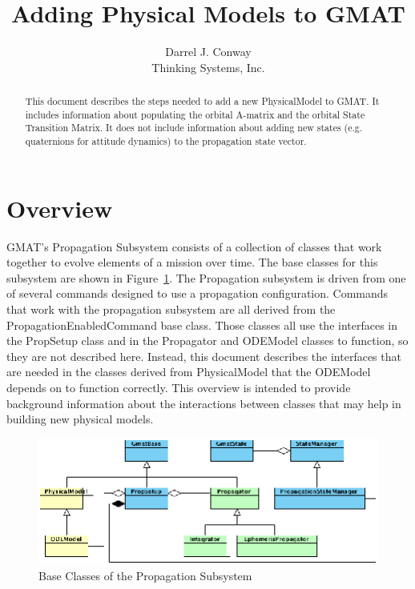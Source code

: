 \documentclass[letterpaper,10pt]{article}
\title{Adding Physical Models to GMAT}
\author{Darrel J. Conway\\Thinking Systems, Inc.}
\begin{document}
\maketitle

\begin{abstract}
This document describes the steps needed to add a new PhysicalModel to GMAT. 
It includes information about populating the orbital A-matrix and the orbital
State Transition Matrix.  It does not include information about adding new
states (e.g. quaternions for attitude dynamics) to the propagation state vector.
\end{abstract}

\section{Overview}

GMAT's Propagation Subsystem consists of a collection of classes that work
together to evolve elements of a mission over time.  The base classes for this
subsystem are shown in Figure~\ref{fig:BasePropClasses}.  The Propagation
subsystem is driven from one of several commands designed to use a propagation
configuration.  Commands that work with the propagation subsystem are all
derived from the PropagationEnabledCommand base class.  Those classes all use
the interfaces in the PropSetup class and in the Propagator and ODEModel
classes to function, so they are not described here.  Instead, this document
describes the interfaces that are needed in the classes derived
from PhysicalModel that the ODEModel depends on to function correctly. This
overview is intended to provide background information about the interactions
between classes that may help in building new physical models.

\begin{figure}[htb]
\begin{centering}
\includegraphics[scale=2.5]{./AddPhysicalModelImages/CorePropSubsystem.eps}
\caption{Base Classes of the Propagation Subsystem}
\label{fig:BasePropClasses}
\end{centering}
\end{figure}
\end{document}
